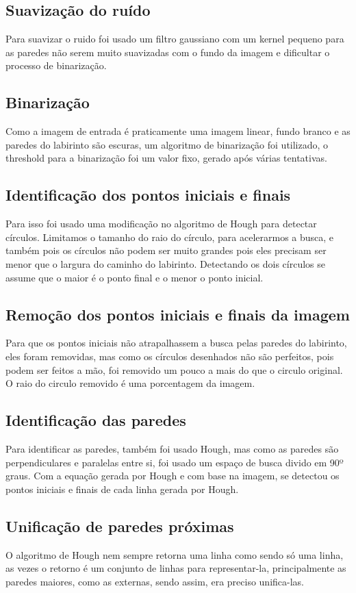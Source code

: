 \documentclass[conference]{IEEEtran}
\begin{document}
\subsection{Suavização do ruído}
 Para suavizar o ruido foi usado um filtro gaussiano com um kernel pequeno para as paredes não serem muito suavizadas com o fundo da imagem e dificultar o processo de binarização.
 \subsection{Binarização}
 Como a imagem de entrada é praticamente uma imagem linear, fundo branco e as paredes do labirinto são escuras, um algoritmo de binarização foi utilizado, o threshold para a binarização foi um valor fixo, gerado após várias tentativas.

\subsection{Identificação dos pontos iniciais e finais}
Para isso foi usado uma modificação no algoritmo de Hough para detectar círculos. Limitamos o tamanho do raio do círculo, para acelerarmos a busca, e também pois os círculos não podem ser muito grandes pois eles precisam ser menor que o largura do caminho do labirinto. Detectando os dois círculos se assume que o maior é o ponto final e o menor o ponto inicial.

\subsection{Remoção dos pontos iniciais e finais da imagem}
Para que os pontos iniciais não atrapalhassem a busca pelas paredes do labirinto, eles foram removidas, mas como os círculos desenhados não são perfeitos, pois podem ser feitos a mão, foi removido um pouco a mais do que o circulo original. O raio do circulo removido é uma porcentagem da imagem.
\subsection{Identificação das paredes}
Para identificar as paredes, também foi usado Hough, mas como as paredes são perpendiculares e paralelas entre si, foi usado um espaço de busca divido em 90º graus. Com a equação gerada por Hough e com base na imagem, se detectou os pontos iniciais e finais de cada linha gerada por Hough.
\subsection{Unificação de paredes próximas}
O algoritmo de Hough nem sempre retorna uma linha como sendo só uma linha, as vezes o retorno é um conjunto de linhas para representar-la, principalmente as paredes maiores, como as externas, sendo assim, era preciso unifica-las.
\end{document}
